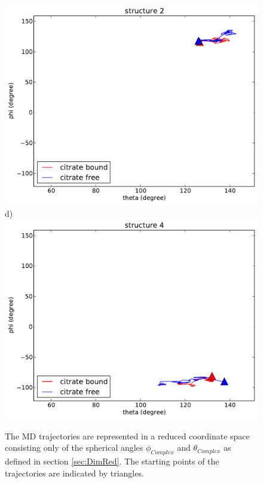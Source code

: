 \documentclass[english, a4paper, 12pt, titlepage, draft]{article}
\begin{document}
\begin{figure}
\begin{minipage}[]{0.45\linewidth}
        \includegraphics[width=\textwidth]{figures/Complex_trajectory/collecitve_coords_structure2.pdf}  
        d)
        \includegraphics[width=\textwidth]{figures/Complex_trajectory/collecitve_coords_structure4.pdf}  
    \end{minipage}
    \caption{The MD trajectories are represented in a reduced coordinate space consisting only of the spherical angles $\phi_{Complex}$ and $\theta_{Complex}$ as defined in section \ref{sec:DimRed}.
        The starting points of the trajectories are indicated by triangles.}
\label{fig:traj_reduced_coords}
\end{figure}     
\end{document}
